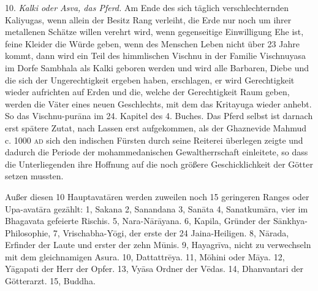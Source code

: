 \documentclass{article}
\begin{document}
10. \emph{Kalki oder Asva, das Pferd.} Am Ende des sich täglich verschlechternden Kaliyugas, wenn allein der Besitz Rang verleiht, die Erde nur noch um ihrer metallenen Schätze willen verehrt wird, wenn gegenseitige Einwilligung Ehe ist, feine Kleider die Würde geben, wenn des Menschen Leben nicht über 23 Jahre kommt, dann wird ein Teil des himmlischen Vischnu in der Familie Vischnuyasa im Dorfe Sambhala als Kalki geboren werden und wird alle Barbaren, Diebe und die sich der Ungerechtigkeit ergeben haben, erschlagen, er wird Gerechtigkeit wieder aufrichten auf Erden und die, welche der Gerechtigkeit Raum geben, werden die Väter eines neuen Geschlechts, mit dem das Kritayuga wieder anhebt. So das Vischnu-pur\={a}na im 24. Kapitel des 4. Buches. Das Pferd selbst ist darnach erst spätere Zutat, nach Lassen erst aufgekommen, als der Ghaznevide Mahmud c. 1000 \textsc{ad} sich den indischen Fürsten durch seine Reiterei überlegen zeigte und dadurch die Periode der mohammedanischen Gewaltherrschaft einleitete, so dass die Unterliegenden ihre Hoffnung auf die noch größere Geschicklichkeit der Götter setzen mussten.

Außer diesen 10 Hauptavat\={a}ren werden zuweilen noch 15 geringeren Ranges oder Upa-avat\={a}ra gezählt: 1, Sakana 2, Sanandana 3, San\={a}ta 4, Sanatkum\={a}ra, vier im Bhagavata gefeierte Rischis. 5, Nara-N\={a}r\={a}yana. 6, Kapila, Gründer der S\={a}nkhya-Philosophie, 7, Vrischabha-Y\={o}gi, der erste der 24 Jaina-Heiligen. 8, N\={a}rada, Erfinder der Laute und erster der zehn M\={u}nis. 9, Hayagr\={i}va, nicht zu verwechseln mit dem gleichnamigen Asura. 10, Dattattr\={e}ya. 11, M\={o}hini oder M\={a}ya. 12, Y\={a}gapati der Herr der Opfer. 13, Vy\={a}sa Ordner der V\={e}das. 14, Dhanvantari der Götterarzt. 15, Buddha.

\begin{center}
\end{center}
\end{document}
